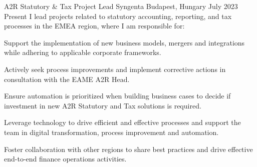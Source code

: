 


\begin{cventries}


  \cventry
    {A2R Statutory \& Tax Project Lead} %
    {Syngenta} %
    {Budapest, Hungary} %
    {July 2023 \textendash Present} %
    {I lead projects related to statutory accounting, reporting, and tax processes in the EMEA region, where I am responsible for:} %
    {
      \begin{cvitems} %
        \item {Support the implementation of new business models, mergers and integrations while adhering to applicable corporate frameworks.}
        \item {Actively seek process improvements and implement corrective actions in consultation with the EAME A2R Head.}
        \item {Ensure automation is prioritized when building business cases to decide if investment in new A2R Statutory and Tax solutions is required.}
        \item {Leverage technology to drive efficient and effective processes and support the team in digital transformation, process improvement and automation.}
        \item {Foster collaboration with other regions to share best practices and drive effective end-to-end finance operations activities.}
      \end{cvitems}
    }



\end{cventries}

